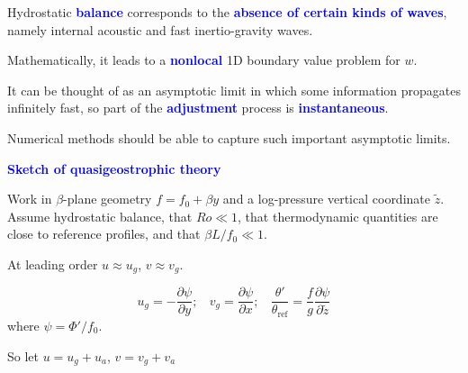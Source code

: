 \documentclass[a4]{seminar}
\newcommand{\B}[1]{\textcolor{blue}{#1}}
\begin{document}
\begin{slide}

Hydrostatic \B{\bf balance} corresponds to the \B{\bf absence of certain
kinds of waves}, namely internal acoustic and fast inertio-gravity waves.

\vspace{2mm}

Mathematically, it leads to a \B{\bf nonlocal} 1D boundary value problem for \( w \).

\vspace{2mm}

It can be thought of as an asymptotic limit in which some information
propagates infinitely fast, so part of the
\B{\bf adjustment} process is \B{\bf instantaneous}.

\vspace{2mm}

Numerical methods should be able to capture such important asymptotic
limits.


\end{slide}


\begin{slide}

\B{\bf Sketch of quasigeostrophic theory}

\vspace{3mm}

Work in \(\beta\)-plane geometry \( f = f_0 + \beta y\) and a log-pressure
vertical coordinate \( \tilde{z} \). Assume hydrostatic balance, that \( Ro \ll 1 \),
that thermodynamic quantities are close to reference profiles, and that
\( \beta L / f_0 \ll 1\).

\vspace{2mm}

At leading order \( u \approx u_g \), \( v \approx v_g \).

\vspace{2mm}
\begin{displaymath}
u_g = -\frac{\partial \psi}{\partial y}; \ \ \ \ 
v_g = \frac{\partial \psi}{\partial x}; \ \ \ \ 
\frac{\theta'}{\theta_{\mathrm{ref}}} = \frac{f}{g} \frac{\partial
\psi}{\partial \tilde{z}}
\end{displaymath}
where \( \psi = \Phi' / f_0 \).

\vspace{2mm}

So let
\( u = u_g + u_a \), \( v = v_g + v_a \)


\end{slide}
\end{document}
